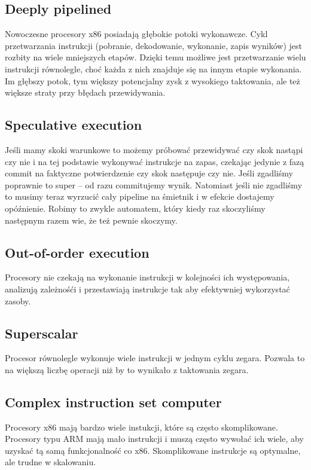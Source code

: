 \subsection{Deeply pipelined}
Nowoczesne procesory x86 posiadają głębokie potoki wykonawcze. Cykl przetwarzania instrukcji (pobranie, dekodowanie, wykonanie, zapis wyników) jest rozbity na wiele mniejszych etapów. Dzięki temu możliwe jest przetwarzanie wielu instrukcji równolegle, choć każda z nich znajduje się na innym etapie wykonania. Im głębszy potok, tym większy potencjalny zysk z wysokiego taktowania, ale też większe straty przy błędach przewidywania.
\subsection{Speculative execution}
Jeśli mamy skoki warunkowe to możemy próbować przewidywać czy skok nastąpi czy nie i na tej podstawie wykonywać instrukcje na zapas, czekając jedynie z fazą commit na faktyczne potwierdzenie czy skok następuje czy nie.
Jeśli zgadliśmy poprawnie to super – od razu commitujemy wynik. Natomiast jeśli nie zgadliśmy to musimy teraz wyrzucić cały pipeline na śmietnik i w efekcie dostajemy opóźnienie.
Robimy to zwykle automatem, który kiedy raz skoczyliśmy następnym razem wie, że też pewnie skoczymy.
\subsection{Out-of-order execution}
Procesory nie czekają na wykonanie instrukcji w kolejności ich występowania, analizują zależnośći i przestawiają instrukcje tak aby efektywniej wykorzystać zasoby. 
\subsection{Superscalar}
Procesor równolegle wykonuje wiele instrukcji w jednym cyklu zegara. Pozwala to na większą liczbę operacji niż by to wynikało z taktowania zegara. 
\subsection{Complex instruction set computer}
Procesory x86 mają bardzo wiele instukcji, które są często skomplikowane. Procesory typu ARM mają mało instrukcji i muszą często wywołać ich wiele, aby uzyskać tą samą funkcjonalność co x86. Skomplikowane instrukcje są optymalne, ale trudne w skalowaniu.
